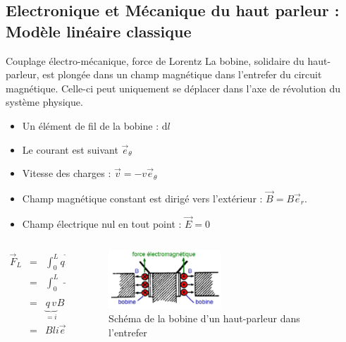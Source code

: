 \documentclass[aspectratio=169]{beamer}
\begin{document}
\subsection{Electronique et Mécanique du haut parleur : Modèle linéaire classique}
\begin{frame}{Couplage électro-mécanique, force de Lorentz}
	La bobine, solidaire du haut-parleur, est plongée dans un champ magnétique dans l'entrefer du circuit magnétique. Celle-ci peut uniquement se déplacer dans l'axe de révolution du système physique. 
\begin{itemize}
	\item Un élément de fil de la bobine : $\mathrm dl$
	\item Le courant est suivant $\vec{e}_\theta$
	\item Vitesse des charges : $\vec{v} = -v \vec{e}_\theta$
	\item Champ magnétique constant est dirigé vers l'extérieur : $\vec{B} = B \vec{e}_r$.
	\item Champ électrique nul en tout point : $\vec{E} = 0$
\end{itemize}
\begin{columns}[t]\small
  \begin{column}{.5\textwidth}
  \begin{displaymath}
	\begin{array}{rcl}
	\vec{F}_L & = & \int_0^L q\vec{E} + q \vec{v}\wedge\vec{B} \, \mathrm dl \\
	& = & \int_0^L - q v\vec{e}_\theta \wedge B \vec{e}_r \, \mathrm dl \\
	& = & \underbrace{q\, v}_{=i} B \int_0^L  \vec{e}_x \, \mathrm dl \\
	& = & Bli \vec{e}_x
	\end{array}		
	\end{displaymath}
  \end{column}
  \begin{column}{.5\textwidth}
  \begin{figure}[!h]
	\includegraphics[width=0.5\textwidth]{figure/laplace_1.jpg}
	\caption{Schéma de la bobine d'un haut-parleur dans l'entrefer}
	\end{figure}
  \end{column}
\end{columns}


\end{frame}
\end{document}
